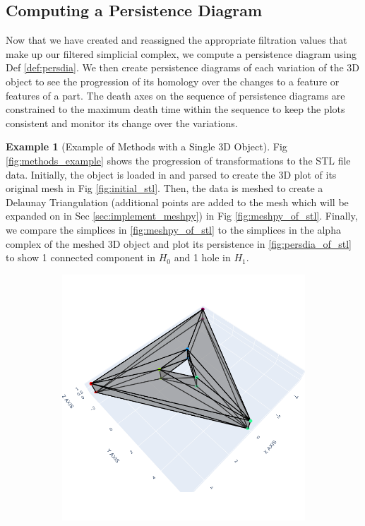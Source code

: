 \documentclass[ma]{uncgdissertationexp}
\theoremstyle{plain}
\theoremstyle{definition}
\newtheorem{example}[theorem]{Example}
\theoremstyle{remark}
\begin{document}
\subsection{Computing a Persistence Diagram}
\label{sec:compute_persdia}
\par Now that we have created and reassigned the appropriate filtration values that make up our filtered simplicial complex, we compute a persistence diagram using Def \ref{def:persdia}. We then create persistence diagrams of each variation of the 3D object to see the progression of its homology over the changes to a feature or features of a part. The death axes on the sequence of persistence diagrams are constrained to the maximum death time within the sequence to keep the plots consistent and monitor its change over the variations.
\newpage
\begin{example}[Example of Methods with a Single 3D Object]
\par Fig \ref{fig:methods_example} shows the progression of transformations to the STL file data. Initially, the object is loaded in and parsed to create the 3D plot of its original mesh in Fig \ref{fig:initial_stl}. Then, the data is meshed to create a Delaunay Triangulation (additional points are added to the mesh which will be expanded on in Sec \ref{sec:implement_meshpy}) in Fig \ref{fig:meshpy_of_stl}. Finally, we compare the simplices in \ref{fig:meshpy_of_stl} to the simplices in the alpha complex of the meshed 3D object and plot its persistence in \ref{fig:persdia_of_stl} to show 1 connected component in $H_{0}$ and 1 hole in $H_{1}$.
\begin{figure}[H]
    \centering
    \begin{subfigure}[b]{0.3\textwidth}
        \centering
        \includegraphics[width=\textwidth]{Final Run, (triangular prism - triangle hole) ast plotly screenshot.png}

\end{subfigure}
\end{figure}
\end{example}
\end{document}
